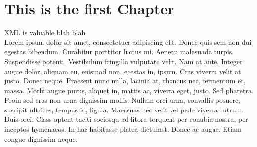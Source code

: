 \documentclass[12pt]{report}
\def\listofsymbols{ \clearpage}
\begin{document}

\thesistitlepage

\thesiscopyrightpage              

\thesisabstract

\thesisdedicationpage

\thesisacknowledgements

\tableofcontents


\makeatletter \renewcommand{\@dotsep}{10000} \makeatother    %

\listoffigures





\newpage
{}




\chapter{This is the first Chapter}
XML is valuable blah blah\\
Lorem ipsum dolor sit amet, consectetuer adipiscing elit. Donec quis sem non dui egestas bibendum. Curabitur porttitor luctus mi. Aenean malesuada turpis. Suspendisse potenti. Vestibulum fringilla vulputate velit. Nam at ante. Integer augue dolor, aliquam eu, euismod non, egestas in, ipsum. Cras viverra velit at justo. Donec neque. Praesent nunc nulla, lacinia at, rhoncus nec, fermentum et, massa. Morbi augue purus, aliquet in, mattis ac, viverra eget, justo. Sed pharetra. Proin sed eros non urna dignissim mollis. Nullam orci urna, convallis posuere, suscipit ultrices, tempus id, ligula. Maecenas nec velit vel pede viverra rutrum. Duis orci. Class aptent taciti sociosqu ad litora torquent per conubia nostra, per inceptos hymenaeos. In hac habitasse platea dictumst. Donec ac augue. Etiam congue dignissim neque.
\end{document}
